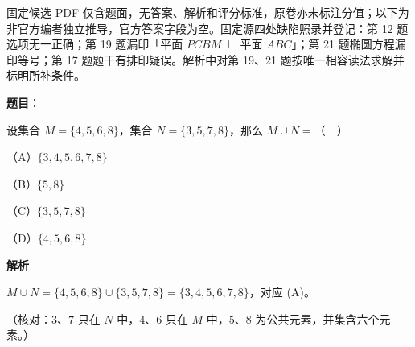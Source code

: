 

\begin{gktip}
固定候选 PDF 仅含题面，无答案、解析和评分标准，原卷亦未标注分值；以下为非官方编者独立推导，官方答案字段为空。固定源四处缺陷照录并登记：第 12 题选项无一正确；第 19 题漏印「平面 $PCBM\perp$ 平面 $ABC$」；第 21 题椭圆方程漏印等号；第 17 题题干有排印疑误。解析中对第 19、21 题按唯一相容读法求解并标明所补条件。
\end{gktip}

\begin{answer}

\textbf{题目}：

设集合 $M=\{4,5,6,8\}$，集合 $N=\{3,5,7,8\}$，那么 $M\cup N=$（　）

（A）$\{3,4,5,6,7,8\}$

（B）$\{5,8\}$

（C）$\{3,5,7,8\}$

（D）$\{4,5,6,8\}$

\textbf{解析}

$M\cup N=\{4,5,6,8\}\cup\{3,5,7,8\}=\{3,4,5,6,7,8\}$，对应 (A)。

（核对：$3$、$7$ 只在 $N$ 中，$4$、$6$ 只在 $M$ 中，$5$、$8$ 为公共元素，并集含六个元素。）


\end{answer}
